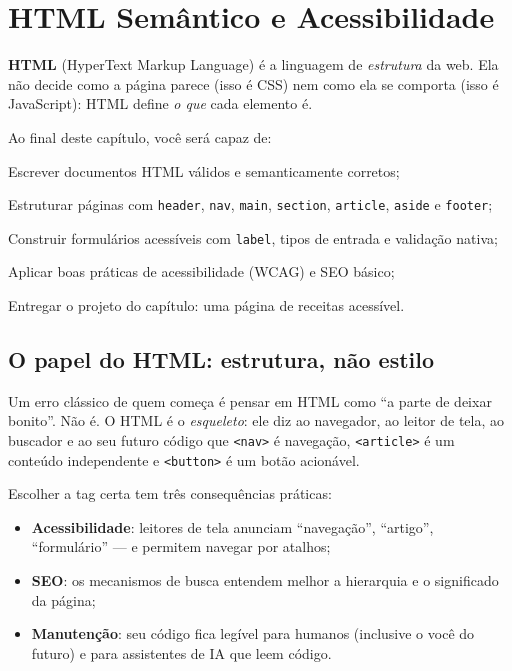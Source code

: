 \chapter{HTML Semântico e Acessibilidade}
\label{cap:html}

\begin{caixaconceito}
\textbf{HTML} (HyperText Markup Language) é a linguagem de \emph{estrutura} da
web. Ela não decide como a página parece (isso é CSS) nem como ela se comporta
(isso é JavaScript): HTML define \emph{o que} cada elemento é.
\end{caixaconceito}

Ao final deste capítulo, você será capaz de:
\begin{objetivos}
  \item Escrever documentos HTML válidos e semanticamente corretos;
  \item Estruturar páginas com \texttt{header}, \texttt{nav}, \texttt{main}, \texttt{section}, \texttt{article}, \texttt{aside} e \texttt{footer};
  \item Construir formulários acessíveis com \texttt{label}, tipos de entrada e validação nativa;
  \item Aplicar boas práticas de acessibilidade (WCAG) e SEO básico;
  \item Entregar o projeto do capítulo: uma página de receitas acessível.
\end{objetivos}

\section{O papel do HTML: estrutura, não estilo}

Um erro clássico de quem começa é pensar em HTML como ``a parte de deixar
bonito''. Não é. O HTML é o \emph{esqueleto}: ele diz ao navegador, ao leitor
de tela, ao buscador e ao seu futuro código que \texttt{<nav>} é navegação,
\texttt{<article>} é um conteúdo independente e \texttt{<button>} é um botão
acionável.

Escolher a tag certa tem três consequências práticas:
\begin{itemize}[leftmargin=*, itemsep=0.3em]
  \item \textbf{Acessibilidade}: leitores de tela anunciam ``navegação'',
  ``artigo'', ``formulário'' — e permitem navegar por atalhos;
  \item \textbf{SEO}: os mecanismos de busca entendem melhor a hierarquia e o
  significado da página;
  \item \textbf{Manutenção}: seu código fica legível para humanos (inclusive o
  você do futuro) e para assistentes de IA que leem código.
\end{itemize}

